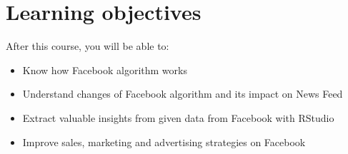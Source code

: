 \documentclass[11pt]{article}
\newcommand{\blankline}{\quad\pagebreak[2]}
\begin{document}
\newcommand{\blankline}
\newcommand{\blankline}




\section*{Learning objectives}
After this course, you will be able to:
\begin{itemize}
\item Know how Facebook algorithm works 
\item Understand changes of Facebook algorithm and its impact on News Feed
\item Extract valuable insights from given data from Facebook with RStudio
\item Improve sales, marketing and advertising strategies on Facebook
\end{itemize}
\end{document}
